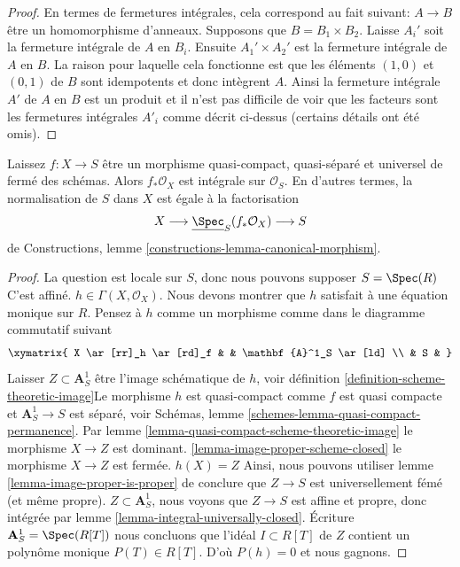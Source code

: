 \begin{proof}

En termes de fermetures intégrales, cela correspond au fait suivant: $A \to B$ être un homomorphisme d'anneaux. Supposons que $B = B_1 \times B_2$. Laisse $A_i'$ soit la fermeture intégrale de $A$ en $B_i$. Ensuite
$A_1' \times A_2'$ est la fermeture intégrale de $A$ en $B$. La raison pour laquelle cela fonctionne est que les éléments $(1, 0)$ et $(0, 1)$ de $B$
sont idempotents et donc intègrent $A$. Ainsi la fermeture intégrale
$A'$ de $A$ en $B$ est un produit et il n'est pas difficile de voir que les facteurs sont les fermetures intégrales $A'_i$ comme décrit ci-dessus (certains détails ont été omis).

\end{proof}

\begin{lemma}

\label{lemma-normalization-in-universally-closed}
Laissez $f : X \to S$ être un morphisme quasi-compact, quasi-séparé et universel de fermé des schémas. Alors $f_*\mathcal{O}_X$ est intégrale sur $\mathcal{O}_S$. En d'autres termes, la normalisation de $S$ dans $X$ est égale à la factorisation $$
X \longrightarrow \underline{\Spec}_S(f_*\mathcal{O}_X)
\longrightarrow S
$$ de Constructions, lemme \ref{constructions-lemma-canonical-morphism}.
\end{lemma}

\begin{proof}

La question est locale sur $S$, donc nous pouvons supposer $S = \Spec(R)$
C'est affiné. $h \in \Gamma(X, \mathcal{O}_X)$. Nous devons montrer que
$h$ satisfait à une équation monique sur $R$. Pensez à $h$ comme un morphisme comme dans le diagramme commutatif suivant
$$
\xymatrix{
X \ar[rr]_h \ar[rd]_f & & \mathbf{A}^1_S \ar[ld] \\
& S &
}
$$
Laisser $Z \subset \mathbf{A}^1_S$ être l'image schématique de $h$, voir définition \ref{definition-scheme-theoretic-image}Le morphisme $h$ est quasi-compact comme $f$ est quasi compacte et
$\mathbf{A}^1_S \to S$ est séparé, voir Schémas, lemme \ref{schemes-lemma-quasi-compact-permanence}. Par lemme \ref{lemma-quasi-compact-scheme-theoretic-image} le morphisme $X \to Z$ est dominant. \ref{lemma-image-proper-scheme-closed} le morphisme
$X \to Z$ est fermée. $h(X) = Z$ Ainsi, nous pouvons utiliser lemme \ref{lemma-image-proper-is-proper}
de conclure que $Z \to S$ est universellement fémé (et même propre). $Z \subset \mathbf{A}^1_S$, nous voyons que $Z \to S$ est affine et propre, donc intégrée par lemme \ref{lemma-integral-universally-closed}. Écriture $\mathbf{A}^1_S = \Spec(R[T])$ nous concluons que l'idéal $I \subset R[T]$ de $Z$ contient un polynôme monique
$P(T) \in R[T]$. D'où $P(h) = 0$ et nous gagnons.

\end{proof}

